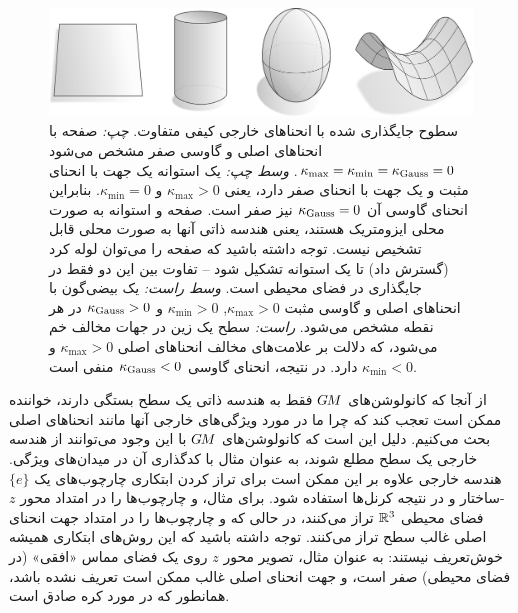 \begin{figure}
    \centering
    \includegraphics[width=1.\textwidth]{figures/curvature_surfaces.pdf}
    \caption{\small
        سطوح جایگذاری شده با انحناهای خارجی کیفی متفاوت.
        \textit{چپ:}
        صفحه با انحناهای اصلی و گاوسی صفر مشخص می‌شود
        $\kappa_{\max} = \kappa_{\min} = \kappa_{\textup{Gauss}} = 0$.
        \textit{وسط چپ:}
        یک استوانه یک جهت با انحنای مثبت و یک جهت با انحنای صفر دارد، یعنی
        $\kappa_{\max} > 0$ و $\kappa_{\min} = 0$.
        بنابراین انحنای گاوسی آن $\kappa_{\textup{Gauss}} = 0$ نیز صفر است.
        صفحه و استوانه به صورت محلی ایزومتریک هستند، یعنی هندسه ذاتی آنها به صورت محلی قابل تشخیص نیست.
        توجه داشته باشید که صفحه را می‌توان لوله کرد (گسترش داد) تا یک استوانه تشکیل شود -- تفاوت بین این دو فقط در جایگذاری در فضای محیطی است.
        \textit{وسط راست:}
        یک بیضی‌گون با انحناهای اصلی و گاوسی مثبت $\kappa_{\max} > 0$, $\kappa_{\min} > 0$ و $\kappa_{\textup{Gauss}} > 0$ در هر نقطه مشخص می‌شود.
        \textit{راست:}
        سطح یک زین در جهات مخالف خم می‌شود، که دلالت بر علامت‌های مخالف انحناهای اصلی $\kappa_{\max} > 0$ و $\kappa_{\min} < 0$ دارد.
        در نتیجه، انحنای گاوسی $\kappa_{\textup{Gauss}} < 0$ منفی است.
    }
    \label{fig:curvature_surfaces}
\end{figure}

از آنجا که کانولوشن‌های $G\mkern-1.4muM$ فقط به هندسه ذاتی یک سطح بستگی دارند، خواننده ممکن است تعجب کند که چرا ما در مورد ویژگی‌های خارجی آنها مانند انحناهای اصلی بحث می‌کنیم.
دلیل این است که کانولوشن‌های $G\mkern-1.4muM$ با این وجود می‌توانند از هندسه خارجی یک سطح مطلع شوند، به عنوان مثال با کدگذاری آن در میدان‌های ویژگی.
هندسه خارجی علاوه بر این ممکن است برای تراز کردن ابتکاری چارچوب‌های یک $\{e\}$-ساختار و در نتیجه کرنل‌ها استفاده شود.
برای مثال، \citet{jin2018learning} و \citet{li2019crossAtlas} چارچوب‌ها را در امتداد محور $z$ فضای محیطی $\mathbb{R}^3$ تراز می‌کنند، در حالی که \citet{boscaini2016learning} و \citet{tatarchenko2018tangent} چارچوب‌ها را در امتداد جهت انحنای اصلی غالب سطح تراز می‌کنند.
توجه داشته باشید که این روش‌های ابتکاری همیشه خوش‌تعریف نیستند:
به عنوان مثال، تصویر محور $z$ روی یک فضای مماس «افقی» (در فضای محیطی) صفر است،
و جهت انحنای اصلی غالب ممکن است تعریف نشده باشد، همانطور که در مورد کره صادق است.






















